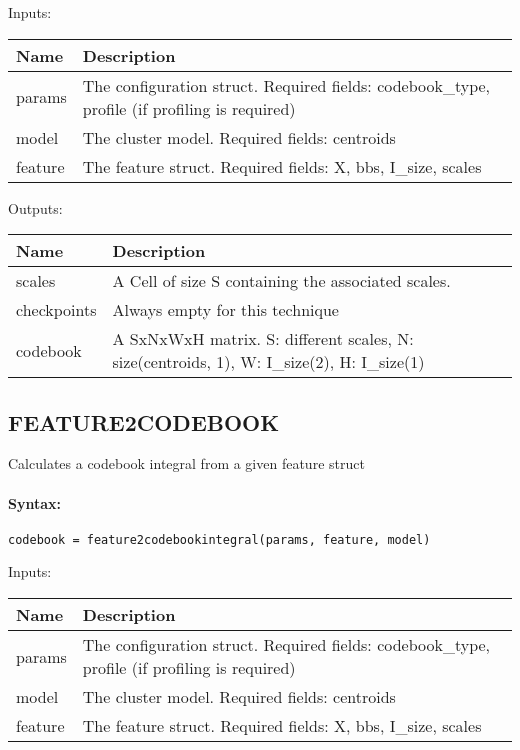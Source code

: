 \bigskip
Inputs:

\begin{tabular}{|p{}|p{}|}
\hline
\textbf{Name} & \textbf{Description} \\
\hline \hline
params & The configuration struct. Required fields: codebook\_type, profile (if profiling is required)  \\ \hline
model & The cluster model. Required fields: centroids  \\ \hline
feature & The feature struct. Required fields: X, bbs, I\_size, scales  \\ \hline
\end{tabular}

\bigskip
Outputs:

\begin{tabular}{|p{}|p{}|}
\hline
\textbf{Name} & \textbf{Description} \\
\hline \hline
scales & A Cell of size S containing the associated scales.  \\ \hline
checkpoints & Always empty for this technique  \\ \hline
codebook & A SxNxWxH matrix. S: different scales, N: size(centroids, 1), W: I\_size(2), H: I\_size(1)  \\ \hline
\end{tabular}

\subsection{FEATURE2CODEBOOK}

Calculates a codebook integral from a given feature struct

\paragraph{Syntax:} \verb|codebook = feature2codebookintegral(params, feature, model)|

\bigskip
Inputs:

\begin{tabular}{|p{}|p{}|}
\hline
\textbf{Name} & \textbf{Description} \\
\hline \hline
params & The configuration struct. Required fields: codebook\_type, profile (if profiling is required)  \\ \hline
model & The cluster model. Required fields: centroids  \\ \hline
feature & The feature struct. Required fields: X, bbs, I\_size, scales  \\ \hline
\end{tabular}

